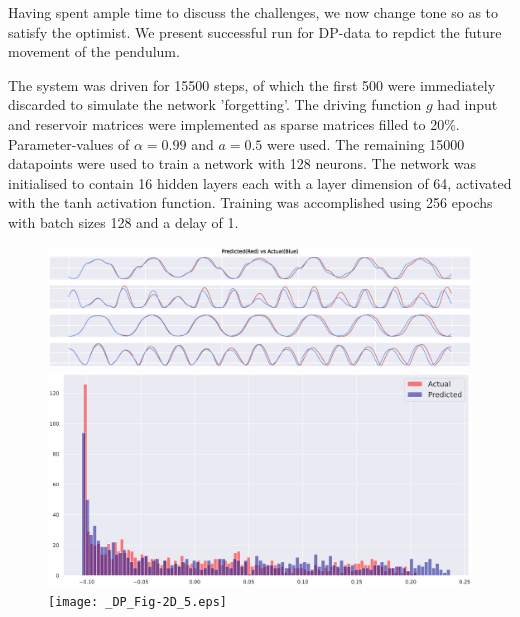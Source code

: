 \documentclass[a4paper,12pt,twoside]{report}
\begin{document}
Having spent ample time to discuss the challenges, we now change tone so as to satisfy the optimist.
We present successful run for DP-data to repdict the future movement of the pendulum.

The system was driven for 15500 steps, of which the first 500 were immediately discarded to simulate the network 'forgetting'. The driving function $g$ had input and reservoir matrices were implemented as sparse matrices filled to 20\%. Parameter-values of $\alpha=0.99$ and $a=0.5$ were used.
The remaining 15000 datapoints were used to train a network with 128 neurons. 
The network was initialised to contain 16 hidden layers each with a layer dimension of 64, activated with the tanh activation function.
Training was accomplished using 256 epochs with batch sizes 128 and a delay of 1. 


\begin{figure}[ht]
  \centering
  \includegraphics[width=0.8\linewidth]{_DP_Fig-2F2023.eps} 
  \includegraphics[width=0.8\linewidth]{_DP_Fig-2B2023.eps}
  \texttt{[image: \_DP\_Fig-2D\_5.eps]}
    \label{fig:dp_predictions}
\end{figure}
\end{document}
